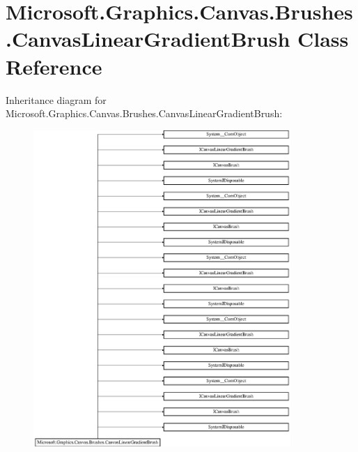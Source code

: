 \hypertarget{class_microsoft_1_1_graphics_1_1_canvas_1_1_brushes_1_1_canvas_linear_gradient_brush}{}\section{Microsoft.\+Graphics.\+Canvas.\+Brushes.\+Canvas\+Linear\+Gradient\+Brush Class Reference}
\label{class_microsoft_1_1_graphics_1_1_canvas_1_1_brushes_1_1_canvas_linear_gradient_brush}
Inheritance diagram for Microsoft.\+Graphics.\+Canvas.\+Brushes.\+Canvas\+Linear\+Gradient\+Brush\+:\begin{figure}[H]
\begin{center}
\leavevmode
\includegraphics[height=12.000000cm]{class_microsoft_1_1_graphics_1_1_canvas_1_1_brushes_1_1_canvas_linear_gradient_brush}
\end{center}
\end{figure}
